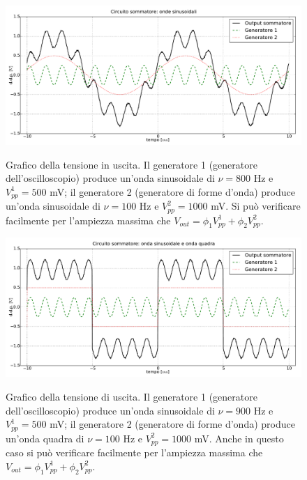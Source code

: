 \begin{figure}[ht]
 \centering
   {\includegraphics[width=14.8cm]{../E01/latex/sinsin.pdf}}
 \caption{Grafico della tensione in uscita. Il generatore 1 (generatore dell'oscilloscopio) produce un'onda sinusoidale di $\nu=800$ \si{\hertz} e $V^1_{pp}=500$ \si{\milli\volt}; il generatore 2 (generatore di forme d'onda) produce un'onda sinusoidale di $\nu=100$ \si{\hertz} e $V^2_{pp}=1000$ \si{\milli\volt}. Si può verificare facilmente per l'ampiezza massima che $V_{out} = \phi_1 V^1_{pp}+\phi_2 V^2_{pp}$.}
 \label{gr:onde1}
\end{figure}

\begin{figure}[ht]
 \centering
   {\includegraphics[width=14.8cm]{../E01/latex/sinquad.pdf}}
 \caption{Grafico della tensione di uscita. Il generatore 1 (generatore dell'oscilloscopio) produce un'onda sinusoidale di $\nu=900$ \si{\hertz} e $V^1_{pp}=500$ \si{\milli\volt}; il generatore 2 (generatore di forme d'onda) produce un'onda quadra di $\nu=100$ \si{\hertz} e $V^2_{pp}=1000$ \si{\milli\volt}. Anche in questo caso si può verificare facilmente per l'ampiezza massima che $V_{out} = \phi_1 V^1_{pp}+\phi_2 V^2_{pp}$.}
 \label{gr:onde2}
\end{figure}

